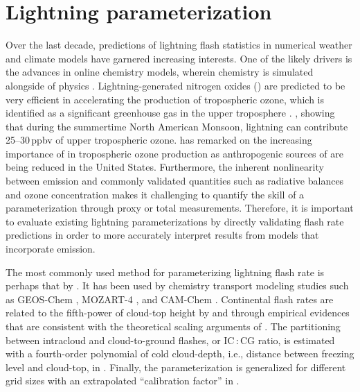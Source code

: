 \chapter{Lightning parameterization} \label{ch:lightning}

\ifpdf
    \graphicspath{{Chapter_lightning/figures/PNG/}{Chapter_lightning/figures/PDF/}{Chapter_lightning/figures/}}
\else
    \graphicspath{{Chapter_lightning/figures/EPS/}{Chapter_lightning/figures/}}
\fi

Over the last decade, predictions of lightning flash statistics in numerical
weather and climate models have garnered increasing interests. One of the
likely drivers is the advances in online chemistry models, wherein chemistry
is simulated alongside of physics \citep[e.g.,][]{Grell:2005fv}.
Lightning-generated nitrogen oxides (\lnox) are predicted to be very
efficient in accelerating the production of tropospheric ozone, which is
identified as a significant greenhouse gas in the upper troposphere
\citep{Lacis:1990fk,Kiehl:1999uq}. \citet{Cooper:2007cr}, showing that during
the summertime North American Monsoon, lightning can contribute 25--30\,ppbv
of upper tropospheric ozone. \citet{Choi:2009bh} has remarked on the increasing
importance of  in tropospheric ozone production as anthropogenic
sources of  are being reduced in the United States. Furthermore,
the inherent nonlinearity between  emission and commonly validated
quantities such as radiative balances and ozone concentration makes it
challenging to quantify the skill of a {\lnox} parameterization through
proxy or total  measurements. Therefore, it is important to
evaluate existing lightning parameterizations by directly validating flash
rate predictions in order to more accurately interpret results from models
that incorporate {\lnox} emission.


The most commonly used method for parameterizing lightning flash rate is
perhaps that by \citet{Price:1992wb,Price:1993fk,Price:1994fk}. It has been
used by chemistry transport modeling studies such as GEOS-Chem
\citep{Hudman:2007fu}, MOZART-4 \citep{Emmons:2010fk}, and CAM-Chem
\citep{Lamarque:2012fk}. Continental flash rates are related to the
fifth-power of cloud-top height by \citet{Williams:1985fk} and
\citet[][hereafter PR92]{Price:1992wb} through empirical evidences that are
consistent with the theoretical scaling arguments of \citet{Vonnegut:1963aa}.
The partitioning between intracloud and cloud-to-ground flashes, or IC\,:\,CG
ratio, is estimated with a fourth-order polynomial of cold cloud-depth, i.e.,
distance between freezing level and cloud-top, in \citet[][hereafter
PR93]{Price:1993fk}. Finally, the parameterization is generalized for
different grid sizes with an extrapolated ``calibration factor'' in
\citet[][hereafter PR94]{Price:1994fk}.

